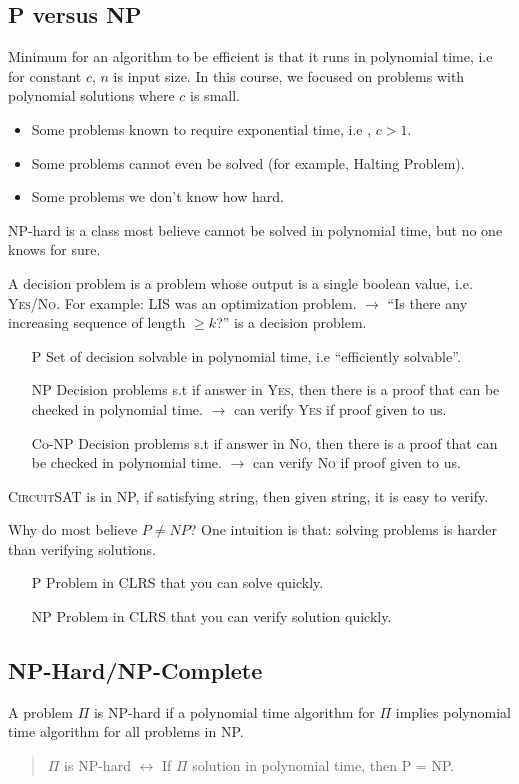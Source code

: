 \subsection{P versus NP}
Minimum for an algorithm to be efficient is that it runs in polynomial time,
i.e  for constant $c$, $n$ is input size.
In this course, we focused on problems with polynomial solutions where $c$ is small.
\begin{itemize}
    \item Some problems known to require exponential time, i.e , $c>1$.
    \item Some problems cannot even be solved (for example, Halting Problem).
    \item Some problems we don't know how hard.
\end{itemize}
NP-hard is a class most believe cannot be solved in polynomial time,
but no one knows for sure.

A decision problem is a problem whose output is a single boolean value,
i.e. \textsc{Yes/No}.
For example: LIS was an optimization problem. $\rightarrow$ ``Is there any increasing sequence of length $\geq k$?''
is a decision problem.
\begin{itemize}[leftmargin=.75in]
    \item[P] Set of decision solvable in polynomial time, i.e ``efficiently solvable''.
    \item[NP] Decision problems s.t if answer in \textsc{Yes}, then there is a proof
        that can be checked in polynomial time. $\rightarrow$ can verify \textsc{Yes} if proof given to us.
    \item[Co-NP] Decision problems s.t if answer in \textsc{No}, then there is a proof
        that can be checked in polynomial time. $\rightarrow$ can verify \textsc{No} if proof given to us.
\end{itemize}
\textsc{CircuitSAT} is in NP, if satisfying string, then given string, it is easy to verify.

Why do most believe $P \neq NP$?
One intuition is that: solving problems is harder than verifying solutions.
\begin{itemize}[leftmargin=.75in]
    \item[P] Problem in CLRS that you can solve quickly.
    \item[NP] Problem in CLRS that you can verify solution quickly.
\end{itemize}

\subsection{NP-Hard/NP-Complete}
A problem $\Pi$ is NP-hard if a polynomial time algorithm for $\Pi$ implies
polynomial time algorithm for all problems in NP.
\begin{quote}
    $\Pi$ is NP-hard $\leftrightarrow$ If $\Pi$ solution in polynomial time, then P = NP.
\end{quote}

